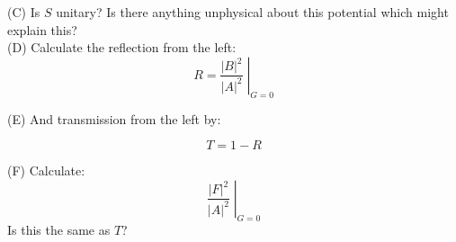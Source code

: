 \documentclass[12pt]{article}
\begin{document}
\noindent
(C) Is $S$ unitary? Is there anything unphysical about this potential which might explain this?\\

\noindent
(D) Calculate the reflection from the left:
$$R = \left. \frac{|B|^2}{|A|^2} \; \right\rvert_{G=0} $$

\noindent
(E) And transmission from the left by:

$$T = 1-R$$

\noindent
(F) Calculate:
$$\left. \frac{|F|^2}{|A|^2} \; \right\rvert_{G=0} $$
Is this the same as $T$?
\end{document}
